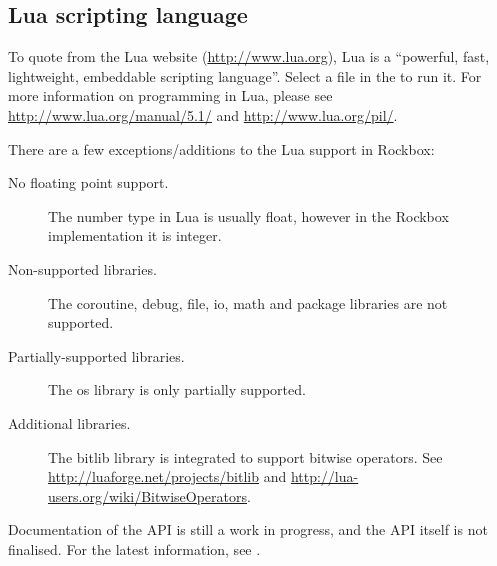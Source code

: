\subsection{Lua scripting language}

To quote from the Lua website (\url{http://www.lua.org}), Lua is a ``powerful,
fast, lightweight, embeddable scripting language''. Select a  file
in the  to run it. For more information on programming
in Lua, please see \url{http://www.lua.org/manual/5.1/} and
\url{http://www.lua.org/pil/}.

There are a few exceptions/additions to the Lua support in Rockbox:
\begin{description}
    \item[No floating point support.] The number type in Lua is usually float,
    however in the Rockbox implementation it is integer.
    \item[Non-supported libraries.] The coroutine, debug, file, io, math
    and package libraries are not supported.
    \item[Partially-supported libraries.]  The os library is only partially
    supported.
    \item[Additional libraries.] The bitlib library is integrated to support
    bitwise operators.  See \url{http://luaforge.net/projects/bitlib} and
    \url{http://lua-users.org/wiki/BitwiseOperators}.
\end{description}

Documentation of the API is still a work in progress, and the API itself is
not finalised. For the latest information, see .\\

